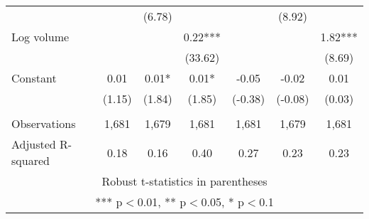 \documentclass[]{article}
\begin{document}
\begin{tabular}{lcccccc}
 &  & (6.78) &  &  & (8.92) &  \\
Log volume &  &  & 0.22*** &  &  & 1.82*** \\
 &  &  & (33.62) &  &  & (8.69) \\
Constant & 0.01 & 0.01* & 0.01* & -0.05 & -0.02 & 0.01 \\
 & (1.15) & (1.84) & (1.85) & (-0.38) & (-0.08) & (0.03) \\
 &  &  &  &  &  &  \\
Observations & 1,681 & 1,679 & 1,681 & 1,681 & 1,679 & 1,681 \\
 Adjusted R-squared & 0.18 & 0.16 & 0.40 & 0.27 & 0.23 & 0.23 \\ \hline
\multicolumn{7}{c}{ Robust t-statistics in parentheses} \\
\multicolumn{7}{c}{ *** p$<$0.01, ** p$<$0.05, * p$<$0.1} \\
\end{tabular}
\end{document}
